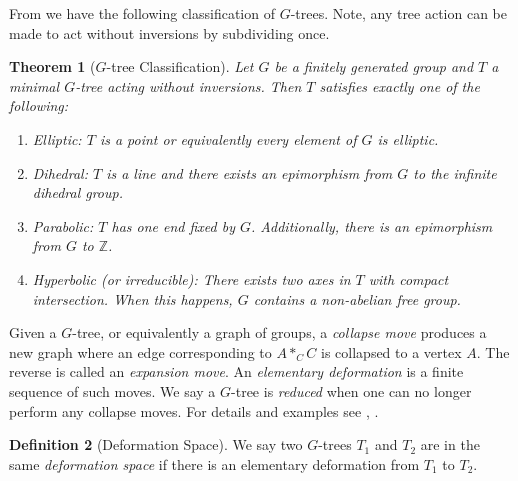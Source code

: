 \documentclass[12pt,parskip=full]{report}
\theoremstyle{plain}
\newtheorem{thm}{Theorem}[section]
\theoremstyle{definition}
\newtheorem{dfn}[thm]{Definition}
\begin{document}
From \cite{boundingcomplexity} we have the following classification of \(G\)-trees. Note, any tree action can be made to act without inversions by subdividing once.
\begin{thm}
    [\(G\)-tree Classification]
    \label{thm:classification}
    Let \(G\) be a finitely generated group and \(T\) a minimal \(G\)-tree acting without inversions. Then \(T\) satisfies exactly one of the following:
    
    \begin{enumerate}
        \item Elliptic: \(T\) is a point or equivalently every element of \(G\) is elliptic.
        \item Dihedral: \(T\) is a line and there exists an epimorphism from \(G\) to the infinite dihedral group.
        \item Parabolic: \(T\) has one end fixed by \(G\). Additionally, there is an epimorphism from \(G\) to \(\mathbb{Z}\).
        \item Hyperbolic (or irreducible): There exists two axes in \(T\) with compact intersection. When this happens, \(G\) contains a non-abelian free group.
    \end{enumerate}
\end{thm}

Given a \(G\)-tree, or equivalently a graph of groups, a \emph{collapse move} produces a new graph where an edge corresponding to \(A*_CC\) is collapsed to a vertex \(A\). The reverse is called an \emph{expansion move}. An \emph{elementary deformation} is a finite sequence of such moves. We say a \(G\)-tree is \emph{reduced} when one can no longer perform any collapse moves. For details and examples see \cite{foresterdeformationrigidity}, \cite{mattclay}.

\begin{dfn}
    [Deformation Space]
    We say two \(G\)-trees \(T_1\) and \(T_2\) are in the same \emph{deformation space} if there is an elementary deformation from \(T_1\) to \(T_2\).
\end{dfn}






\end{document}
